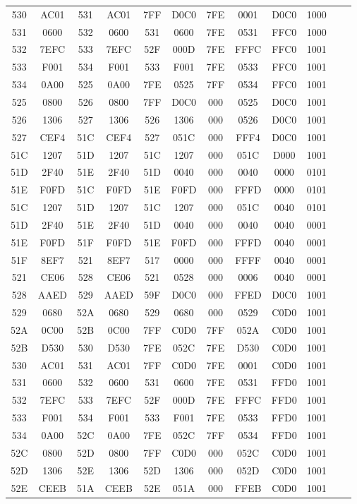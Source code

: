 \begin{center}
\begin{tabular}{|c|c|c|c|c|c|c|c|c|c|c|c|}
		530 & AC01 & 531 & AC01 & 7FF & D0C0 & 7FE & 0001 & D0C0 & 1000 &  & \\
		531 & 0600 & 532 & 0600 & 531 & 0600 & 7FE & 0531 & FFC0 & 1000 &  & \\
		532 & 7EFC & 533 & 7EFC & 52F & 000D & 7FE & FFFC & FFC0 & 1001 &  & \\
		533 & F001 & 534 & F001 & 533 & F001 & 7FE & 0533 & FFC0 & 1001 &  & \\
		534 & 0A00 & 525 & 0A00 & 7FE & 0525 & 7FF & 0534 & FFC0 & 1001 &  & \\
		525 & 0800 & 526 & 0800 & 7FF & D0C0 & 000 & 0525 & D0C0 & 1001 &  & \\
		526 & 1306 & 527 & 1306 & 526 & 1306 & 000 & 0526 & D0C0 & 1001 &  & \\
		527 & CEF4 & 51C & CEF4 & 527 & 051C & 000 & FFF4 & D0C0 & 1001 &  & \\
		\hline
		51C & 1207 & 51D & 1207 & 51C & 1207 & 000 & 051C & D000 & 1001 &  & \\
		51D & 2F40 & 51E & 2F40 & 51D & 0040 & 000 & 0040 & 0000 & 0101 &  & \\
		51E & F0FD & 51C & F0FD & 51E & F0FD & 000 & FFFD & 0000 & 0101 &  & \\
		\hline
		51C & 1207 & 51D & 1207 & 51C & 1207 & 000 & 051C & 0040 & 0101 &  & \\
		51D & 2F40 & 51E & 2F40 & 51D & 0040 & 000 & 0040 & 0040 & 0001 &  & \\
		51E & F0FD & 51F & F0FD & 51E & F0FD & 000 & FFFD & 0040 & 0001 &  & \\
		51F & 8EF7 & 521 & 8EF7 & 517 & 0000 & 000 & FFFF & 0040 & 0001 &  & \\
		521 & CE06 & 528 & CE06 & 521 & 0528 & 000 & 0006 & 0040 & 0001 &  & \\
		528 & AAED & 529 & AAED & 59F & D0C0 & 000 & FFED & D0C0 & 1001 &  & \\
		529 & 0680 & 52A & 0680 & 529 & 0680 & 000 & 0529 & C0D0 & 1001 &  & \\
		52A & 0C00 & 52B & 0C00 & 7FF & C0D0 & 7FF & 052A & C0D0 & 1001 &  & \\
		52B & D530 & 530 & D530 & 7FE & 052C & 7FE & D530 & C0D0 & 1001 &  & \\
		530 & AC01 & 531 & AC01 & 7FF & C0D0 & 7FE & 0001 & C0D0 & 1001 &  & \\
		531 & 0600 & 532 & 0600 & 531 & 0600 & 7FE & 0531 & FFD0 & 1001 &  & \\
		532 & 7EFC & 533 & 7EFC & 52F & 000D & 7FE & FFFC & FFD0 & 1001 &  & \\
		533 & F001 & 534 & F001 & 533 & F001 & 7FE & 0533 & FFD0 & 1001 &  & \\
		534 & 0A00 & 52C & 0A00 & 7FE & 052C & 7FF & 0534 & FFD0 & 1001 &  & \\
		52C & 0800 & 52D & 0800 & 7FF & C0D0 & 000 & 052C & C0D0 & 1001 &  & \\
		52D & 1306 & 52E & 1306 & 52D & 1306 & 000 & 052D & C0D0 & 1001 &  & \\
		52E & CEEB & 51A & CEEB & 52E & 051A & 000 & FFEB & C0D0 & 1001 &  & \\
		\hline
		

\end{tabular}
\end{center}
